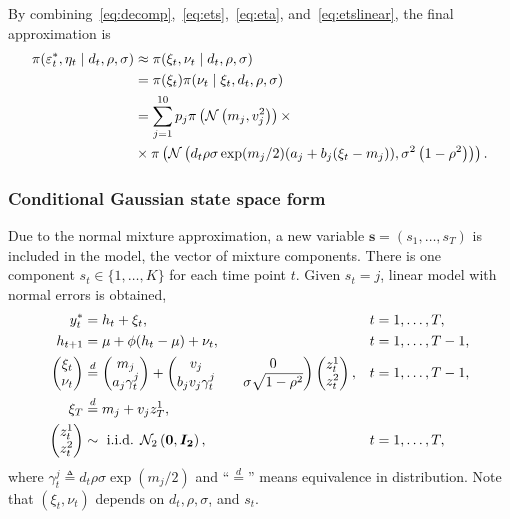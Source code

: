 By combining~\eqref{eq:decomp},~\eqref{eq:ets},~\eqref{eq:eta}, and~\eqref{eq:etslinear}, the final approximation is
\begin{align*}
\pi(\varepsilon_t^\ast,\eta_t\mid d_t,\rho,\sigma) &\approx \pi(\xi_t,\nu_t\mid d_t,\rho,\sigma) \\
&= \pi(\xi_t)\pi(\nu_t\mid\xi_t,d_t,\rho,\sigma) \\
&= \sum_{j=1}^{10}p_j\pi\left(\mathcal{N}\left(m_j,v_j^2\right)\right)\times \\
&\times\pi\left(\mathcal{N}\left(d_t\rho\sigma\exp(m_j/2)(a_j+b_j(\xi_t-m_j)),\sigma^2\left(1-\rho^2\right)\right)\right).
\end{align*}

\subsubsection[State space form]{Conditional Gaussian state space form}

Due to the normal mixture approximation, a new variable $\bm s=(s_1,\dots,s_T)$ is included in the model, the vector of mixture components. There is one component $s_t\in\{1,\dots,K\}$ for each time point $t$. Given $s_t=j$, linear model with normal errors is obtained,
\begin{equation}
\begin{alignedat}{2}\label{form:appr_model}
y_t^\ast & = h_t+\xi_t, && \quad t=1,\dots,T, \\
h_{t+1} & = \mu+\phi(h_t-\mu)+\nu_t, && \quad t=1,\dots,T-1, \\
\begin{pmatrix}
\xi_t \\
\nu_t
\end{pmatrix} &\overset{d}{=}
\begin{pmatrix}
m_j \\
a_j\gamma_t^j
\end{pmatrix} +
\begin{pmatrix}
v_j && 0 \\
b_jv_j\gamma_t^j && \sigma\sqrt{1-\rho^2}
\end{pmatrix}
\begin{pmatrix}
z_t^1 \\
z_t^2
\end{pmatrix}, && \quad t=1,\dots,T-1, \\
\xi_T &\overset{d}{=} m_j+v_jz_T^1, \\
\begin{pmatrix}
z_t^1 \\
z_t^2
\end{pmatrix}
&\sim\text{ i.i.d. }\mathcal{N}_2\left(\bm{0},\bm{I_2}\right), && \quad t=1,\dots,T,
\end{alignedat}
\end{equation}
where $\gamma_t^j\triangleq d_t\rho\sigma\exp(m_j/2)$ and ``$\overset{d}{=}$'' means equivalence in distribution. Note that $(\xi_t,\nu_t)$ depends on $d_t,\rho,\sigma$, and $s_t$.

